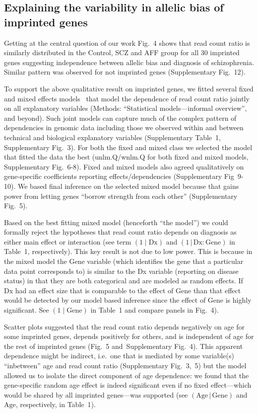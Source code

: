 \documentclass[letterpaper]{article}
\begin{document}
\subsection*{Explaining the variability in allelic bias of imprinted genes}

Getting at the central question of our work Fig.~4 shows
that read count ratio is similarly distributed in the Control, SCZ and AFF
group for all 30 imprinted genes suggesting independence between allelic bias and diagnosis of
schizophrenia.  Similar pattern was observed for not imprinted genes
(Supplementary Fig.~12).

To support the above qualitative result on imprinted genes, we fitted several
fixed and mixed effects models~\cite{Hoffman2016} that model the dependence of
read count ratio jointly on all explanatory variables (Methods: ``Statistical
models---informal overview'', and beyond).  Such joint
models can capture much of the complex pattern of dependencies in genomic data
including those we observed within and between technical and biological
explanatory variables (Supplementary Table~1,
Supplementary Fig.~3).  For both the fixed and mixed class we
selected the model that fitted the data the best (unlm.Q/wnlm.Q for both fixed
and mixed models,
Supplementary Fig.~6-8).
Fixed and mixed models also agreed qualitatively on gene-specific coefficients
reporting effects/dependencies
(Supplementary Fig~9-10). We based final
inference on the selected mixed model because that gains power from letting
genes ``borrow strength from each other'' (Supplementary Fig.~5).

Based on the best fitting mixed model (henceforth ``the model'') we could
formally reject the hypotheses that read count ratio depends on diagnosis as
either main effect or interaction (see term \((1\mid\mathrm{Dx})\) and
\((1\,|\,\mathrm{Dx}:\mathrm{Gene})\) in Table~1,
respectively).  This key result is not due to low power. This is because in
the mixed model the Gene variable (which identifies the gene that a particular
data point corresponds to) is similar to the Dx variable (reporting on disease
status) in that they are both categorical and are modeled as random effects.
If Dx had an effect size that is comparable to the effect of Gene than that
effect would be detected by our model based inference since the effect of Gene
is highly significant. See \((1\mid\mathrm{Gene})\) in Table~1
and compare panels in Fig.~4).

Scatter plots suggested that the read count ratio depends negatively on age
for some imprinted genes, depends positively for others, and is independent of
age for the rest of imprinted genes (Fig.~5
and~Supplementary Fig.~4).  This apparent dependence might be indirect, i.e.~one
that is mediated by some variable(s) ``inbetween'' age and read count ratio
(Supplementary Fig.~3,~5) but the
model allowed us to isolate the direct component of age dependence: we found
that the gene-specific random age effect is indeed significant even if no
fixed effect---which would be shared by all imprinted genes---was supported
(see \((\mathrm{Age}\,|\,\mathrm{Gene})\) and \(\mathrm{Age}\), respectively,
in Table~1).
\end{document}
